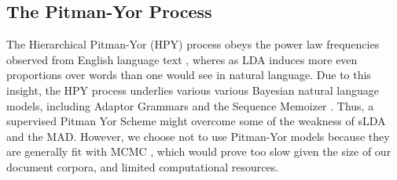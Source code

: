 \documentclass[14pt]{article} %
\theoremstyle{plain}
\theoremstyle{definition}
\theoremstyle{remark}
\begin{document}
\begin{appendix}
\section{The Pitman-Yor Process}
\label{appendix:pitman}
The Hierarchical Pitman-Yor (HPY) process obeys the power law frequencies observed from English language text \cite{teh2006hierarchical}, wheres as LDA induces more even proportions over words than one would see in natural language. Due to this insight, the HPY process underlies various various Bayesian natural language models, including Adaptor Grammars \cite{johnson2007adaptor} and the Sequence Memoizer \cite{wood2009stochastic}. Thus, a supervised Pitman Yor Scheme might overcome some of the weakness of sLDA and the MAD. However, we choose not to use Pitman-Yor models because they are generally fit with MCMC \cite{teh2006hierarchical}, which would prove too slow given the size of our document corpora, and limited computational resources.


\end{appendix}
\end{document}
